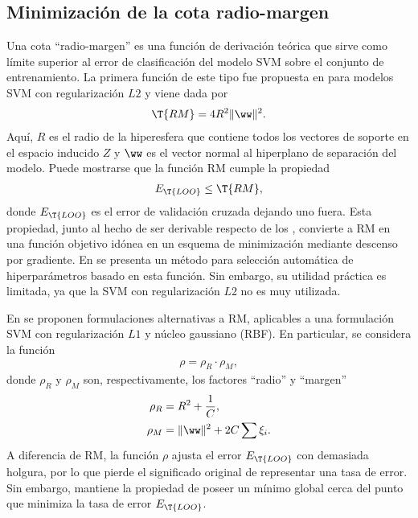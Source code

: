 %
%
\subsection{Minimización de la cota radio-margen}
%
Una cota ``radio-margen'' es una función de derivación teórica que
sirve como límite superior al error de clasificación
 del modelo SVM sobre el conjunto de
entrenamiento.
La primera función de este tipo fue propuesta en \cite{vapnik}
para modelos SVM con regularización $L2$ y viene dada por
\begin{align}
  \T{RM} = 4R^2 \|\ww\|^2.
\end{align}
%
Aquí, $R$ es el radio de la hiperesfera que contiene todos los
vectores de soporte en el espacio inducido $Z$ y $\ww$ es el vector
normal al hiperplano de separación del modelo.
Puede mostrarse que la función RM cumple la propiedad
%
\begin{align}
  E_{\T{LOO}} \leq \T{RM},
\end{align}
%
donde $E_{\T{LOO}}$ es el error de validación cruzada dejando uno
fuera.
Esta propiedad, junto al hecho de ser derivable respecto de los
, convierte a RM en una función objetivo idónea en un
esquema de minimización mediante descenso por gradiente.
En \cite{chapelle} se presenta un método para selección automática de
hiperparámetros basado en esta función.
Sin embargo, su utilidad práctica es limitada, ya que
la SVM con regularización $L2$ no es muy utilizada.

En \cite{chung} se proponen formulaciones alternativas a RM,
aplicables a una formulación SVM con regularización $L1$ y núcleo
gaussiano (RBF).
En particular, se considera la función
%
\begin{align}
  \rho = \rho_R \cdot \rho_M,
\end{align}
%
donde $\rho_R$ y $\rho_M$ son, respectivamente, los factores ``radio''
y ``margen''
%
\begin{align}
  \label{rho-r}
  \rho_R &= R^2+\frac{1}{C}, \\
  \label{rho-m}
  \rho_M &= \|\ww\|^2+2C\sum\xi_i.
\end{align}
%
A diferencia de {RM}, la función $\rho$ ajusta el error $E_{\T{LOO}}$
con demasiada holgura, por lo que pierde el significado original de
representar una tasa de error.
Sin embargo, mantiene la propiedad de poseer un mínimo global cerca
del punto que minimiza la tasa de error $E_{\T{LOO}}$.
